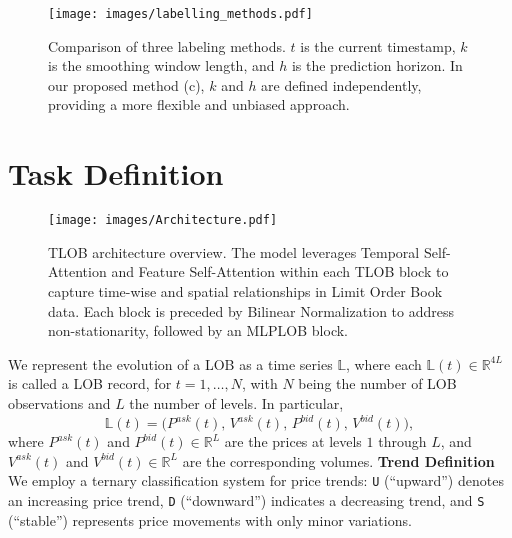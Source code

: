 
\begin{figure}
    \centering
    \texttt{[image: images/labelling\_methods.pdf]}
    \caption{Comparison of three labeling methods. $t$ is the current timestamp, $k$ is the smoothing window length, and $h$ is the prediction horizon. In our proposed method (c), $k$ and $h$ are defined independently, providing a more flexible and unbiased approach.}
    \label{fig:labeling}
\end{figure}
\section{Task Definition}
\label{sec:task}
\begin{figure*}[h!]
    \centering
    \texttt{[image: images/Architecture.pdf]}
    \vspace{-0.6cm}
    \caption{TLOB architecture overview. The model leverages Temporal Self-Attention and Feature Self-Attention within each TLOB block to capture time-wise and spatial relationships in Limit Order Book data. Each block is preceded by Bilinear Normalization to address non-stationarity, followed by an MLPLOB block.}
    \label{fig:architecture}
\end{figure*}
We represent the evolution of a LOB as a time series $\mathbb{L}$, where each $\mathbb{L}(t) \in \mathbb{R}^{4L}$ is called a LOB record, for $t=1,\ldots,N$, with $N$ being the number of LOB observations and $L$ the number of levels. In particular,
\begin{equation}
\mathbb{L}(t) = \bigl(P^{ask}(t),\, V^{ask}(t),\, P^{bid}(t),\, V^{bid}(t)\bigr),
\end{equation}
where $P^{ask}(t)$ and $P^{bid}(t)\in \mathbb{R}^L$ are the prices at levels $1$ through $L$, and $V^{ask}(t)$ and $V^{bid}(t)\in \mathbb{R}^L$ are the corresponding volumes.
\textbf{Trend Definition}
\label{sec:data_labelling}
We employ a ternary classification system for price trends: 
\texttt{U} (``upward'') denotes an increasing price trend, 
\texttt{D} (``downward'') indicates a decreasing trend, 
and \texttt{S} (``stable'') represents price movements with only minor variations.

